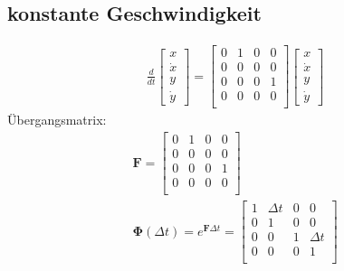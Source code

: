 \subsection{konstante Geschwindigkeit}
\begin{gather}
	\frac{d}{dt}\begin{bmatrix}
	x \\
	\dot{x} \\
	y \\
	\dot{y}
	\end{bmatrix} = \begin{bmatrix}
	0 & 1 & 0 & 0\\
	0 & 0 & 0 & 0\\
	0 & 0 & 0 & 1\\
	0 & 0 & 0 & 0\\
	\end{bmatrix}\begin{bmatrix}
	x \\
	\dot{x} \\
	y \\
	\dot{y}
	\end{bmatrix}
\end{gather}
Übergangsmatrix:
\begin{gather}
	\bm{F} = \begin{bmatrix}
	0 & 1 & 0 & 0\\
	0 & 0 & 0 & 0\\
	0 & 0 & 0 & 1\\
	0 & 0 & 0 & 0\\
	\end{bmatrix} \\
	\bm{\Phi}(\Delta t) = e^{\bm{F} \Delta t} =\begin{bmatrix}
	1 & \Delta t & 0 & 0\\
	0 & 1 & 0 & 0\\
	0 & 0 & 1 & \Delta t\\
	0 & 0 & 0 & 1\\
	\end{bmatrix}
\end{gather}

